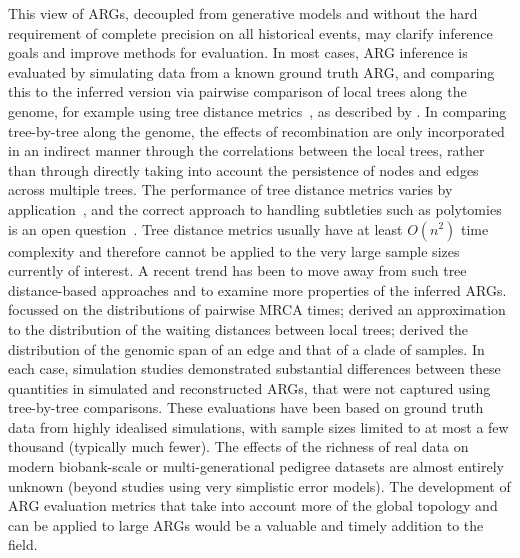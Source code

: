 \documentclass{article}
\begin{document}
This view of ARGs,
decoupled from generative models and
without the hard requirement
of complete precision on all historical events, may clarify inference goals and improve
methods for evaluation.
In most cases,
ARG inference is evaluated by simulating data from a known ground truth ARG,
and comparing this to the inferred version via pairwise comparison of
local trees along the genome, for example
using tree distance
metrics~\citep[e.g.][]{robinson1981comparison,kendall2016mapping},
as described by \citet{kuhner2015assessing}.
In comparing tree-by-tree along the genome, the effects of recombination
are only incorporated in an indirect manner through the correlations
between the local trees, rather than through directly taking into account
the persistence of nodes and edges across multiple trees.
The performance of tree distance metrics varies by
application~\citep{kuhner2015assessing}, and the correct approach
to handling subtleties such as polytomies
is an open question~\citep{kelleher2019inferring,zhang2023biobank}.
Tree distance metrics usually have at least $O(n^2)$ time complexity
and therefore cannot be
applied to the very large sample sizes currently of interest.
A recent trend has been to move away from such
tree distance-based approaches and to examine more properties of the inferred ARGs.
\citet{brandt2021evaluation} focussed on the
distributions of pairwise MRCA times;
\citet{deng2021distribution} derived an approximation to the distribution of the
waiting distances between local trees;
\citet{ignatieva2023distribution}
derived the distribution of the genomic span of an edge and that of a
clade of samples. In each case, simulation studies demonstrated
substantial differences between these quantities in simulated and reconstructed ARGs,
that were not captured using tree-by-tree comparisons.
These evaluations have been based on
ground truth data from highly idealised simulations, with sample sizes limited to at most a few thousand (typically much fewer).
The effects of the richness of real data
on modern biobank-scale or multi-generational pedigree datasets
are almost entirely unknown (beyond studies using very simplistic error models).
The development of ARG evaluation metrics that take into account more of the
global topology and can be applied to large ARGs would be a
valuable and timely addition to the field.
\end{document}
